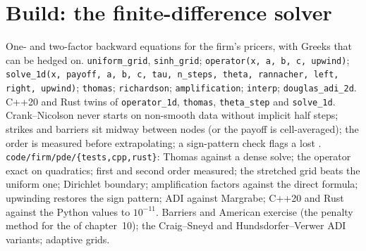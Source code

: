 \section{Build: the finite-difference solver}\label{bld:qm:finite-difference-methods:pde}

\begin{build}
 One- and two-factor backward equations for the firm's pricers, with Greeks that can be hedged on.
 \texttt{uniform\_grid}, \texttt{sinh\_grid}; \texttt{operator(x, a, b, c, upwind)}; \texttt{solve\_1d(x, payoff, a, b, c, tau, n\_steps, theta, rannacher, left, right, upwind)};
\texttt{thomas}; \texttt{richardson}; \texttt{amplification}; \texttt{interp}; \texttt{douglas\_adi\_2d}. C++20 and Rust twins of \texttt{operator\_1d}, \texttt{thomas}, \texttt{theta\_step} and
\texttt{solve\_1d}.
 Crank--Nicolson never starts on non-smooth data without implicit half steps; strikes and barriers sit midway between nodes (or the payoff is cell-averaged); the order is measured before
extrapolating; a sign-pattern check flags a lost .
 \texttt{code/firm/pde/\{tests,cpp,rust\}}: Thomas against a dense solve; the operator exact on quadratics; first and second order measured; the stretched grid beats the
uniform one; Dirichlet boundary; amplification factors against the direct formula; upwinding restores the sign pattern; ADI against Margrabe; C++20 and Rust against the Python values to $10^{-11}$.
 Barriers and American exercise (the penalty method for the  of chapter~10); the Craig--Sneyd and Hundsdorfer--Verwer ADI variants; adaptive grids.
\end{build}

